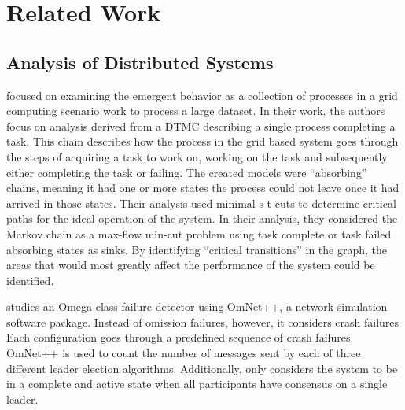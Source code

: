 

\chapter{Related Work}

\section{Analysis of Distributed Systems}

\cite{markov-distributed} focused on examining the emergent behavior as a collection of processes in a grid computing scenario work to process a large dataset.
In their work, the authors focus on analysis derived from a \ac{DTMC} describing a single process completing a task.
This chain describes how the process in the grid based system goes through the steps of acquiring a task to work on, working on the task and subsequently either completing the task or failing.
The created models were ``absorbing'' chains, meaning it had one or more states the process could not leave once it had arrived in those states.
Their analysis used minimal s-t cuts to determine critical paths for the ideal operation of the system.
In their analysis, they considered the Markov chain as a max-flow min-cut problem using task complete or task failed absorbing states as sinks.
By identifying ``critical transitions'' in the graph, the areas that would most greatly affect the performance of the system could be identified.

\cite{LEADERELECTIONEVAL} studies an Omega class failure detector using OmNet++\cite{OMNET}, a network simulation software package.
Instead of omission failures, however, it considers crash failures
Each configuration goes through a predefined sequence of crash failures.
OmNet++ is used to count the number of messages sent by each of three different leader election algorithms.
Additionally, \cite{LEADERELECTIONEVAL} only considers the system to be in a complete and active state when all participants have consensus on a single leader.

